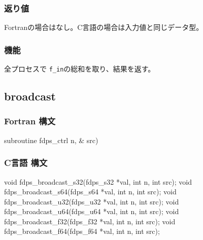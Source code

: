 \subsubsection*{返り値}
Fortranの場合はなし。C言語の場合は入力値と同じデータ型。

\subsubsection*{機能}
全プロセスで {\tt f\_in}の総和を取り、結果を返す。
\clearpage

\subsection{broadcast}
\subsubsection*{Fortran 構文}
\begin{screen}
\begin{spverbatim}
subroutine fdps_ctrl%
                               n,   &
                               src)
\end{spverbatim}
\end{screen}

\subsubsection*{C言語 構文}
\begin{screen}
\begin{spverbatim}
void fdps_broadcast_s32(fdps_s32 *val, int n, int src);
void fdps_broadcast_s64(fdps_s64 *val, int n, int src);
void fdps_broadcast_u32(fdps_u32 *val, int n, int src);
void fdps_broadcast_u64(fdps_u64 *val, int n, int src);
void fdps_broadcast_f32(fdps_f32 *val, int n, int src);
void fdps_broadcast_f64(fdps_f64 *val, int n, int src);
\end{spverbatim}
\end{screen}

